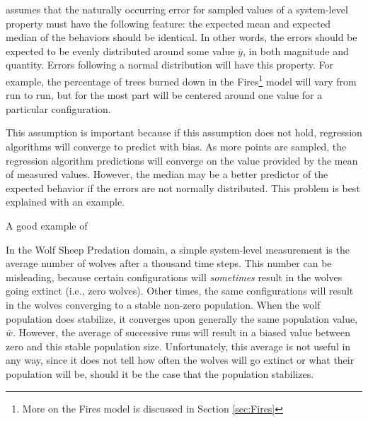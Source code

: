 \fw assumes that the naturally occurring error for sampled values of a system-level property must have the following feature: the expected mean and expected median of the behaviors should be identical.
In other words, the errors should be expected to be evenly distributed around some value $\bar y$, in  both magnitude and quantity.
Errors following a normal distribution will have this property.
For example, the percentage of trees burned down in the Fires\footnote{More on the Fires model is discussed in Section \ref{sec:Fires}} model will vary from run to run, but for the most part will be centered around one value for a particular configuration.

This assumption is important because if this assumption does not hold, regression algorithms will converge to predict with bias.
As more points are sampled, the regression algorithm predictions will converge on the value provided by the mean of measured values.
However, the median may be a better predictor of the expected behavior if the errors are not normally distributed.
This problem is best explained with an example.

A good example of 

In the Wolf Sheep Predation domain, a simple system-level measurement is the average number of wolves after a thousand time steps.
This number can be misleading, because certain configurations will \textit{sometimes} result in the wolves going extinct (i.e., zero wolves).
Other times, the same configurations will result in the wolves converging to a stable non-zero population.
When the wolf population does stabilize, it converges upon generally the same population value, $\bar w$.
However, the average of successive runs will result in a biased value between zero and this stable population size.
Unfortunately, this average is not useful in any way, since it does not tell how often the wolves will go extinct or what their population will be, should it be the case that the population stabilizes.


